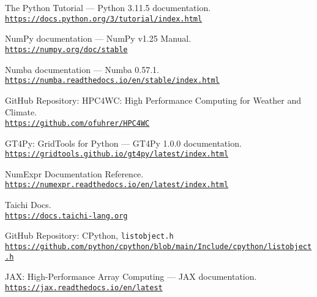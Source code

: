 \documentclass[12pt]{article}
\begin{document}
\newpage
\begin{thebibliography}{9}
     The Python Tutorial — Python 3.11.5 documentation.\\\href{https://docs.python.org/3/tutorial/index.html}{\texttt{https://docs.python.org/3/tutorial/index.html}}

     NumPy documentation — NumPy v1.25 Manual.\\\href{https://numpy.org/doc/stable}{\texttt{https://numpy.org/doc/stable}}

     Numba documentation — Numba 0.57.1.\\\href{https://numba.readthedocs.io/en/stable/index.html}{\texttt{https://numba.readthedocs.io/en/stable/index.html}}
    
     GitHub Repository: HPC4WC: High Performance Computing for Weather and Climate.\\\href{https://github.com/ofuhrer/HPC4WC}{\texttt{https://github.com/ofuhrer/HPC4WC}}

     GT4Py: GridTools for Python — GT4Py 1.0.0 documentation.\\ \href{https://gridtools.github.io/gt4py/latest/index.html}{\texttt{https://gridtools.github.io/gt4py/latest/index.html}}
    
     NumExpr Documentation Reference.\\\href{https://numexpr.readthedocs.io/en/latest/index.html}{\texttt{https://numexpr.readthedocs.io/en/latest/index.html}}

     Taichi Docs.\\\href{https://docs.taichi-lang.org}{\texttt{https://docs.taichi-lang.org}}

     GitHub Repository: CPython, \texttt{listobject.h}\\\href{https://github.com/python/cpython/blob/main/Include/cpython/listobject.h}{\texttt{https://github.com/python/cpython/blob/main/Include/cpython/listobject.h}}

     JAX: High-Performance Array Computing — JAX documentation.\\\href{https://jax.readthedocs.io/en/latest}{\texttt{https://jax.readthedocs.io/en/latest}}
\end{thebibliography}
\end{document}
